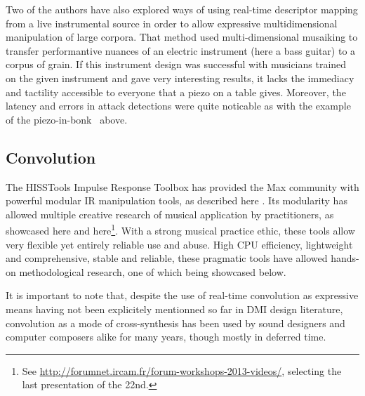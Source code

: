 
Two of the authors have also explored ways of using real-time descriptor mapping from a live instrumental source in order to allow expressive multidimensional manipulation of large corpora\cite{TremblaySchwarz-nime2010-surfing-the-waves}. That method used multi-dimensional musaiking to transfer performantive nuances of an electric instrument (here a bass guitar) to a corpus of grain. If this instrument design was successful with musicians trained on the given instrument and gave very interesting results, it lacks the immediacy and tactility accessible to everyone that a piezo on a table gives. Moreover, the latency and errors in attack detections were quite noticable as with the example of the piezo-in-bonk~ above.


\subsection{Convolution}

The HISSTools Impulse Response Toolbox has provided the Max community with powerful modular IR manipulation tools, as described here \cite{HarkerTremblay-icmc2012-hisstools}. Its modularity has allowed multiple creative research of musical application by practitioners, as showcased here \cite{HarkerTremblay-forum2013-rethinking-the-box} and here\footnote{See \url{http://forumnet.ircam.fr/forum-workshops-2013-videos/}, selecting the last presentation of the 22nd.}. With a strong musical practice ethic, these tools allow very flexible yet entirely reliable use and abuse. High CPU efficiency, lightweight and comprehensive, stable and reliable, these pragmatic tools have allowed hands-on methodological research, one of which being showcased below.

It is important to note that, despite the use of real-time convolution as expressive means having not been explicitely mentionned so far in DMI design literature, convolution as a mode of cross-synthesis has been used by sound designers and computer composers alike for many years, though mostly in deferred time.